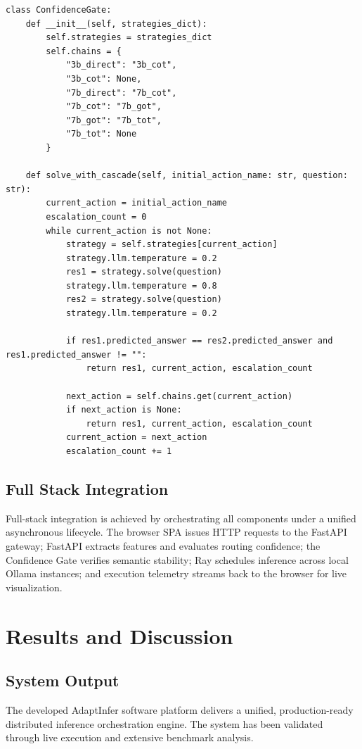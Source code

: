 \documentclass[12pt,a4paper]{report}
\begin{document}
\begin{verbatim}
class ConfidenceGate:
    def __init__(self, strategies_dict):
        self.strategies = strategies_dict
        self.chains = {
            "3b_direct": "3b_cot",
            "3b_cot": None,
            "7b_direct": "7b_cot",
            "7b_cot": "7b_got",
            "7b_got": "7b_tot",
            "7b_tot": None
        }

    def solve_with_cascade(self, initial_action_name: str, question: str):
        current_action = initial_action_name
        escalation_count = 0
        while current_action is not None:
            strategy = self.strategies[current_action]
            strategy.llm.temperature = 0.2
            res1 = strategy.solve(question)
            strategy.llm.temperature = 0.8
            res2 = strategy.solve(question)
            strategy.llm.temperature = 0.2
            
            if res1.predicted_answer == res2.predicted_answer and res1.predicted_answer != "":
                return res1, current_action, escalation_count
                
            next_action = self.chains.get(current_action)
            if next_action is None:
                return res1, current_action, escalation_count
            current_action = next_action
            escalation_count += 1
\end{verbatim}

\section{Full Stack Integration}
\label{sec:full_stack_integration}
Full-stack integration is achieved by orchestrating all components under a unified asynchronous lifecycle. The browser SPA issues HTTP requests to the FastAPI gateway; FastAPI extracts features and evaluates routing confidence; the Confidence Gate verifies semantic stability; Ray schedules inference across local Ollama instances; and execution telemetry streams back to the browser for live visualization.

\chapter{Results and Discussion}
\label{ch:results}

\section{System Output}
\label{sec:system_output}
The developed AdaptInfer software platform delivers a unified, production-ready distributed inference orchestration engine. The system has been validated through live execution and extensive benchmark analysis.
\end{document}
